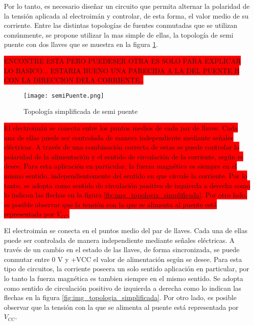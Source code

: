 Por lo tanto, es necesario diseñar un circuito que permita alternar la polaridad de la tensión aplicada al electroimán y controlar, de esta forma, el valor medio de su corriente. Entre las distintas topologías de fuentes conmutadas que se utilizan comúnmente, se propone utilizar la mas simple de ellas, la topología de semi puente con dos llaves que se muestra en la figura \ref{fig:img_topologia_semipuente}.

\colorbox{red}{ENCONTRE ESTA PERO PUEDESER OTRA ES SOLO PARA EXPLICAR LO BASICO... ESTARIA BUENO UNA PARECIDA A LA DEL PUENTE H CON LA DIRECCION DELA CORRIENTE.. }
\begin{figure}[H]
	\centering
	\texttt{[image: semiPuente.png]}
	\caption{Topología simplificada de semi puente}
	\label{fig:img_topologia_semipuente}
\end{figure} 

\colorbox{red}{
El electroimán se conecta entre los puntos medios de cada par de llaves. Cada una de ellas puede ser controlada de manera independiente mediante señales eléctricas. A través de una combinación correcta de estas se puede controlar la polaridad de la alimentación y el sentido de circulación de la corriente, según se desee. Para esta aplicación en particular, la fuerza magnética es siempre en el mismo sentido, independientemente del sentido en que circule la corriente. Por lo tanto, se adopta como sentido de circulación positivo de izquierda a derecha como lo indican las flechas en la figura \ref{fig:img_topologia_simplificada}. Por otro lado, es posible observar que la tensión con la que se alimenta al puente está representada por $V_{CC}$.
}


El electroimán se conecta en el puntos medio del par de llaves. Cada una de ellas puede ser controlada de manera independiente mediante señales eléctricas. A través de un cambio en el estado de las llaves, de forma sincronizada, se puede conmutar entre 0 V y +VCC el valor de alimentación según se desee. Para esta tipo de circuitos, la corriente poseera un solo sentido aplicación en particular, por lo tanto la fuerza magnética es tambien siempre en el mismo sentido. Se adopta como sentido de circulación positivo de izquierda a derecha como lo indican las flechas en la figura \ref{fig:img_topologia_simplificada}. Por otro lado, es posible observar que la tensión con la que se alimenta al puente está representada por $V_{CC}$.

